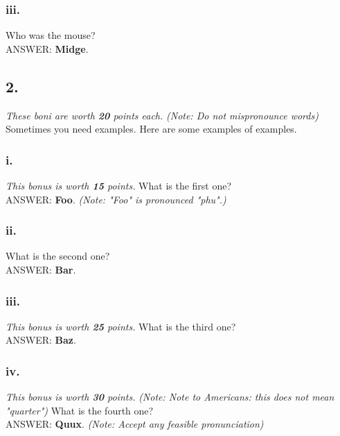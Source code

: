 \documentclass[12pt]{article}
\begin{document}
\subsubsection*{\textbf{iii.}}
Who was the mouse?\\
ANSWER: 
\textbf{Midge}.
\subsection*{\textbf{2.}}
\textit{These boni are worth \textbf{20} points each.}
\textit{(Note: Do not mispronounce words)}
Sometimes you need examples.  Here are some examples of examples.
\subsubsection*{\textbf{i.}} \textit{This bonus is worth \textbf{15} points.}
What is the first one?\\
ANSWER: 
\textbf{Foo}.
\textit{(Note: "Foo" is pronounced "phu".)}
\subsubsection*{\textbf{ii.}}
What is the second one?\\
ANSWER: 
\textbf{Bar}.
\subsubsection*{\textbf{iii.}} \textit{This bonus is worth \textbf{25} points.}
What is the third one?\\
ANSWER: 
\textbf{Baz}.
\subsubsection*{\textbf{iv.}} \textit{This bonus is worth \textbf{30} points.}
\textit{(Note: Note to Americans: this does not mean "quarter")}
What is the fourth one?\\
ANSWER: 
\textbf{Quux}.
\textit{(Note: Accept any feasible pronunciation)}
\end{document}
